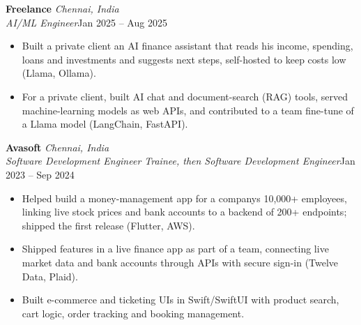 \documentclass[a4paper,11pt]{article}
\newcommand{\role}[4]{%
  \textbf{#1}{\color{muted}\,\textperiodcentered\,\textit{#2}}\\
  \textit{#4}\hfill{\color{muted}#3}\par}
\newcommand{\gap}{\vspace{5pt}}
\begin{document}
\gap
{}
\role{Freelance}{Chennai, India}{Jan 2025 – Aug 2025}{AI/ML Engineer}
\begin{itemize}
  \item Built a private client an AI finance assistant that reads his income, spending, loans and investments and suggests next steps, self-hosted to keep costs low (Llama, Ollama).
  \item For a private client, built AI chat and document-search (RAG) tools, served machine-learning models as web APIs, and contributed to a team fine-tune of a Llama model (LangChain, FastAPI).
\end{itemize}
\gap
{}
\role{Avasoft}{Chennai, India}{Jan 2023 – Sep 2024}{Software Development Engineer Trainee, then Software Development Engineer}
\begin{itemize}
  \item Helped build a money-management app for a company\textquotesingle{}s 10,000+ employees, linking live stock prices and bank accounts to a backend of 200+ endpoints; shipped the first release (Flutter, AWS).
  \item Shipped features in a live finance app as part of a team, connecting live market data and bank accounts through APIs with secure sign-in (Twelve Data, Plaid).
  \item Built e-commerce and ticketing UIs in Swift/SwiftUI with product search, cart logic, order tracking and booking management.
\end{itemize}
\end{document}
